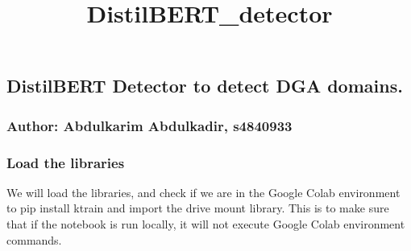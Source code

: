 \documentclass[11pt]{article}
\title{DistilBERT\_detector}
\begin{document}
    
    \maketitle
    
    

    
    \hypertarget{distilbert-detector-to-detect-dga-domains.}{%
\subsection{DistilBERT Detector to detect DGA
domains.}\label{distilbert-detector-to-detect-dga-domains.}}

\hypertarget{author-abdulkarim-abdulkadir-s4840933}{%
\subsubsection{Author: Abdulkarim Abdulkadir,
s4840933}\label{author-abdulkarim-abdulkadir-s4840933}}

    \hypertarget{load-the-libraries}{%
\subsubsection{Load the libraries}\label{load-the-libraries}}

We will load the libraries, and check if we are in the Google Colab
environment to pip install ktrain and import the drive mount library.
This is to make sure that if the notebook is run locally, it will not
execute Google Colab environment commands.
\end{document}
